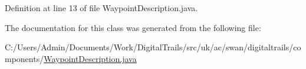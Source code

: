 Definition at line 13 of file Waypoint\+Description.\+java.



The documentation for this class was generated from the following file\+:\begin{DoxyCompactItemize}
\item 
C\+:/\+Users/\+Admin/\+Documents/\+Work/\+Digital\+Trails/src/uk/ac/swan/digitaltrails/components/\hyperlink{_waypoint_description_8java}{Waypoint\+Description.\+java}\end{DoxyCompactItemize}
